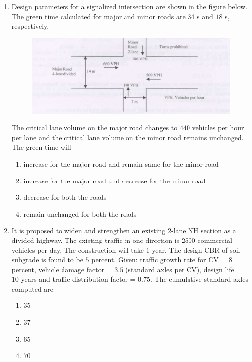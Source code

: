 \documentclass[journal]{IEEEtran}
\begin{document}
\begin{enumerate}
\item Design parameters for a signalized intersection are shown in the figure below. The green time calculated for major and minor roads are $34$ s and $18$ s, respectively. \textbf{}

\begin{figure}[h]
    \centering
    \includegraphics[width=0.8\columnwidth]{figs/fig5.png}
\end{figure}

The critical lane volume on the major road changes to $440$ vehicles per hour per lane and the critical lane volume on the minor road remains unchanged. The green time will


\begin{enumerate}
\item increase for the major road and remain same for the minor road
\item increase for the major road and decrease for the minor road
\item decrease for both the roads
\item remain unchanged for both the roads
\end{enumerate}  


\item It is proposed to widen and strengthen an existing $2$-lane NH section as a divided highway. The existing traffic in one direction is 2500 commercial vehicles  per day. The construction will take $1$ year. The design CBR of soil subgrade is found to be $5$ percent. Given: traffic growth rate for CV = $8$ percent, vehicle damage factor = $3.5$ (standard axles per CV), design life = $10$ years and traffic distribution factor = $0.75$. The cumulative standard axles  computed are \textbf{}
\begin{multicols}{2}
\begin{enumerate}
\item $35$
\item $37$
\item $65$
\item $70$
\end{enumerate}  
\end{multicols}


\end{enumerate}
\end{document}
